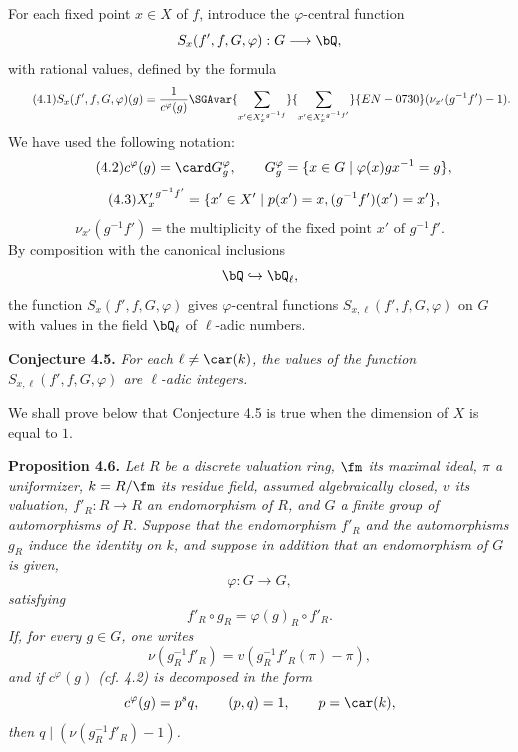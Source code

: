 For each fixed point $x\in X$ of $f$, introduce the $\varphi$-central function
\[
S_x(f',f,G,\varphi):G\longrightarrow \bQ,
\]
with rational values, defined by the formula
\begin{equation}\tag{4.1}
S_x(f',f,G,\varphi)(g)=
\frac{1}{c^\varphi(g)}
\SGAvar{\sum_{x'\in {X'_x}^{g^{-1}f}}}{\sum_{x'\in {X'_x}^{g^{-1}f'}}}{EN-0730}(\nu_{x'}(g^{-1}f')-1).
\end{equation}
We have used the following notation:
\begin{equation}\tag{4.2}
c^\varphi(g)=\card G_g^\varphi,
\qquad
G_g^\varphi=\{x\in G\mid \varphi(x)gx^{-1}=g\},
\end{equation}
\begin{equation}\tag{4.3}
{X'_x}^{g^{-1}f'}=\{x'\in X'\mid p(x')=x,\\ (g^{-1}f')(x')=x'\},
\end{equation}
\begin{equation}\tag{4.4}
\nu_{x'}(g^{-1}f')=\text{the multiplicity of the fixed point }x'\text{ of }g^{-1}f'.
\end{equation}
By composition with the canonical inclusions
\[
\bQ\hookrightarrow \bQ_\ell,
\]
the function $S_x(f',f,G,\varphi)$ gives $\varphi$-central functions $S_{x,\ell}(f',f,G,\varphi)$ on $G$ with values in the field $\bQ_\ell$ of $\ell$-adic numbers.

\medskip
\noindent
\textbf{Conjecture 4.5.} \emph{For each $\ell\ne\car(k)$, the values of the function $S_{x,\ell}(f',f,G,\varphi)$ are $\ell$-adic integers.}

\medskip
We shall prove below that Conjecture 4.5 is true when the dimension of $X$ is equal to $1$.

\medskip
\noindent
\textbf{Proposition 4.6.} \emph{Let $R$ be a discrete valuation ring, $\fm$ its maximal ideal, $\pi$ a uniformizer, $k=R/\fm$ its residue field, assumed algebraically closed, $v$ its valuation, $f'_R:R\to R$ an endomorphism of $R$, and $G$ a finite group of automorphisms of $R$. Suppose that the endomorphism $f'_R$ and the automorphisms $g_R$ induce the identity on $k$, and suppose in addition that an endomorphism of $G$ is given,
\[
\varphi:G\longrightarrow G,
\]
satisfying
\[
f'_R\circ g_R=\varphi(g)_R\circ f'_R.
\]
If, for every $g\in G$, one writes
\[
\nu(g_R^{-1}f'_R)=v(g_R^{-1}f'_R(\pi)-\pi),
\]
and if $c^\varphi(g)$ (cf. 4.2) is decomposed in the form
\[
c^\varphi(g)=p^sq,
\qquad (p,q)=1,
\qquad p=\car(k),
\]
then $q\mid(\nu(g_R^{-1}f'_R)-1)$.}

